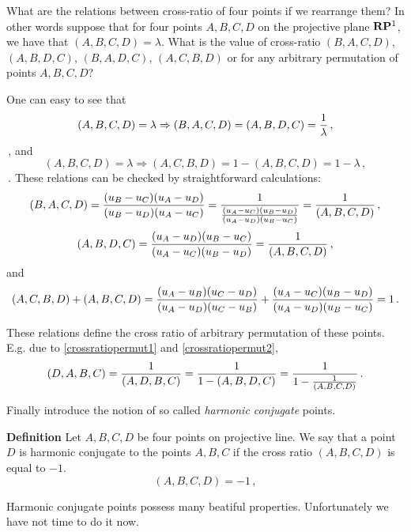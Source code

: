 \documentclass[12pt]{article}
\numberwithin{equation}{section}
\begin{document}
 What are the relations between cross-ratio of four points
if we rearrange them? In other words suppose
that for four points $A,B,C,D$ on the projective plane
 ${\bf R}{\bf P}^1$, we have that $(A,B,C,D)=\lambda$.
  What is the value of cross-ratio 
   $(B,A,C,D)$, $(A,B,D,C)$, $(B,A,D,C)$, $(A,C,B,D)$
   or for any arbitrary permutation of points $A,B,C,D$?

  One can easy to see that 
      \begin{equation}\label{crossratiopermut1}
(A,B,C,D)=\lambda\Rightarrow     
(B,A,C,D)=(A,B,D,C)={1\over \lambda}\,,
      \end{equation}\,,
and
       \begin{equation}\label{crossratiopermut2}
(A,B,C,D)=\lambda\Rightarrow     
(A,C,B,D)=1-(A,B,C,D)=1-\lambda\,,
      \end{equation}\,.
 These relations can be checked 
by straightforward calculations:
              $$
  (B,A,C,D)={(u_B-u_C)(u_A-u_D)\over
             (u_B-u_D)(u_A-u_C) }
              =
        {1\over {(u_A-u_C)(u_B-u_D)\over
             (u_A-u_D)(u_B-u_C) }
                  }={1\over (A,B,C,D)}\,,
                  $$
              $$
  (A,B,D,C)={(u_A-u_D)(u_B-u_C)\over
             (u_A-u_C)(u_B-u_D) }={1\over (A,B,C,D)}\,,
             $$             
and
        $$
 (A,C,B,D)+(A,B,C,D)={(u_A-u_B)(u_C-u_D)\over
             (u_A-u_D)(u_C-u_B) }+
      {(u_A-u_C)(u_B-u_D)\over
             (u_A-u_D)(u_B-u_C) }=
      1\,.
       $$
{\footnotesize   These relations define the cross
ratio of arbitrary permutation of these points.
 E.g. due to 
\eqref{crossratiopermut1}
and \eqref{crossratiopermut2},
     $$
(D,A,B,C)={1\over (A,D,B,C)}=
 {1\over 1-(A,B,D,C)}=
 {1\over 1-{1\over (A,B,C,D)}}\,.
      $$


} 





Finally introduce the notion of so called
{\it harmonic conjugate} points.


{\bf Definition}   Let  $A,B,C,D$ be four points
on projective line. We say that
a point $D$ is harmonic conjugate to
the points $A,B,C$  if the cross ratio $(A,B,C,D)$ 
is equal to $-1$.
      \begin{equation}\label{harmonicconjugate}
(A,B,C,D)=-1\,,
      \end{equation}
          
   Harmonic conjugate points possess many beatiful properties.
Unfortunately we have not time to do it now.
\end{document}
